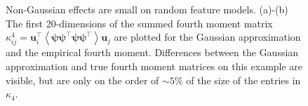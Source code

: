 \documentclass{article} %
\def\u{\mathbf u}
\begin{document}
\begin{figure}[ht]
    \centering
    \caption{Non-Gaussian effects are small on random feature models. (a)-(b) The first 20-dimensions of the summed fourth moment matrix $\kappa^4_{ij} = \u_i^\top \left< \bm\psi \bm\psi^\top \bm\psi \bm\psi^\top  \right> \u_j$ are plotted for the Gaussian approximation and the empirical fourth moment. Differences between the Gaussian approximation and true fourth moment matrices on this example are visible, but are only on the order of $\sim 5\%$ of the size of the entries in $\kappa_4$. }
    \label{fig:nonlin_batch_noise}
\end{figure}
\end{document}
